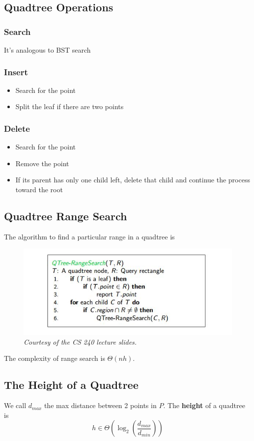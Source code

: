 \documentclass{report}
\begin{document}
\subsection{Quadtree Operations}
\subsubsection{Search}
It's analogous to BST search
\subsubsection{Insert}
\begin{itemize}
\item Search for the point
\item Split the leaf if there are two points
\end{itemize}
\subsubsection{Delete}
\begin{itemize}
\item Search for the point
\item Remove the point
\item If its parent has only one child left, delete that child and continue the process toward the root
\end{itemize}
\subsection{Quadtree Range Search}
The algorithm to find a particular range in a quadtree is
\begin{figure}[ht]
\begin{center}
\includegraphics[scale=0.6]{algo1.jpg}
\end{center}
\caption{\textit{Courtesy of the CS 240 lecture slides.}}
\end{figure}
The complexity of range search is $\Theta(nh)$.
\subsection{The Height of a Quadtree}
We call $d_{max}$ the max distance between 2 points in $P$. The \textbf{height}  of a quadtree is $$h \in \Theta\left(\log_2 \displaystyle\left(\frac{d_{max}}{d_{min}}\right)\right)$$
\end{document}
